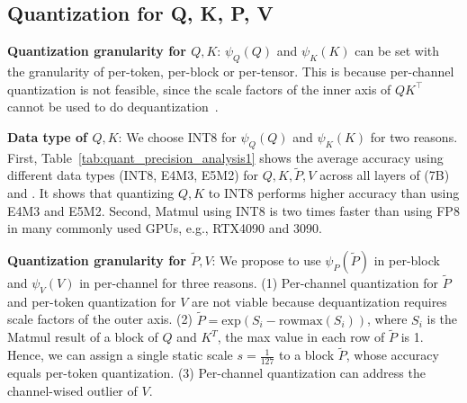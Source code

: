 \begin{table}[htb!]
\begin{minipage}{0.46\textwidth}
        \label{tab:quant_precision_analysis2}
        \setlength\tabcolsep{2.1pt}
    \end{minipage}
\end{table}


\subsection{Quantization for Q, K, P, V} \label{sec:qkpv_quant}

\textbf{Quantization granularity for $Q, K$}: 
$\psi_Q(Q)$ and $\psi_K(K)$ can be set with the granularity of per-token, per-block or per-tensor. This is because per-channel quantization is not feasible, since the scale factors of the inner axis of $Q K^\top$ cannot be used to do dequantization~\citep{xiao2023smoothquant}.
 

\textbf{Data type of $Q, K$}: We choose INT8 for $\psi_Q(Q)$ and $\psi_K(K)$ for two reasons. First, Table~\ref{tab:quant_precision_analysis1} shows the average accuracy using different data types (INT8, E4M3, E5M2) for $Q, K, \widetilde P, V$ across all layers of \llama(7B)~\citep{touvron2023llama2} and \unidiffuser. It shows that quantizing $Q, K$ to INT8 performs higher accuracy than using E4M3 and E5M2.
Second, Matmul using INT8 is two times faster than using FP8 in many commonly used GPUs, e.g., RTX4090 and 3090.
 
        

\textbf{Quantization granularity for $\widetilde P, V$}: We propose to use $\psi_P(\widetilde P)$ in per-block and $\psi_V(V)$ in per-channel for three reasons. (1) Per-channel quantization for $\widetilde P$ and per-token quantization for $V$ are not viable because dequantization requires scale factors of the outer axis. (2) $\widetilde P = \mathrm{exp}(S_i - \mathrm{rowmax}(S_i))$, where $S_i$ is the Matmul result of a block of $Q$ and $K^T$, the max value in each row of $\widetilde P$ is 1. Hence, we can assign a single static scale $s = \frac{1}{127}$ to a block $\widetilde P$, whose accuracy equals per-token quantization. (3) Per-channel quantization can address the channel-wised outlier of $V$.

